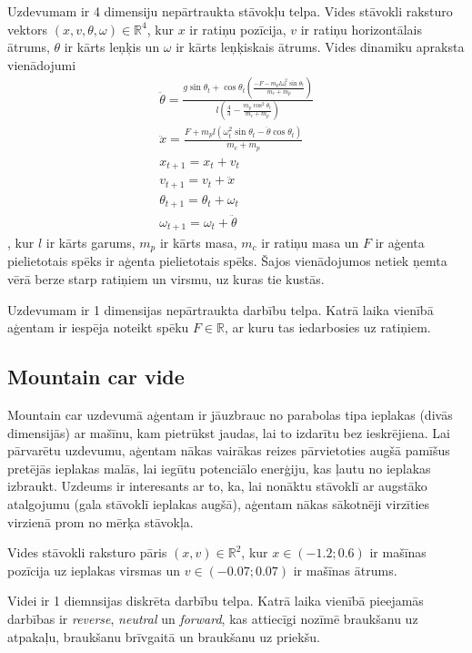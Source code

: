 \documentclass{ludis} %
\begin{document}
Uzdevumam ir 4 dimensiju nepārtraukta stāvokļu telpa. Vides stāvokli raksturo
vektors $(x, v, \theta, \omega) \in \mathbb{R}^4$, kur $x$ ir ratiņu pozīcija,
$v$ ir ratiņu horizontālais ātrums, $\theta$ ir kārts leņķis un $\omega$ ir
kārts leņķiskais ātrums. Vides dinamiku apraksta vienādojumi
\begin{gather}
  \ddot{\theta} = \frac{g \sin\theta_t + \cos\theta_t \left(\frac{-F - m_p l \omega_t^2\sin\theta_t}
                                                         {m_c + m_p}\right)}
                        {l \left(\frac{4}{3} - \frac{m_p\cos^2\theta_t}
                                               {m_c + m_p}\right)} \\ 
  \ddot{x} = \frac{F + m_p l \left(\omega_t^2\sin\theta_t - \ddot{\theta}\cos\theta_t\right)}
                   {m_c + m_p} \\
  x_{t+1} = x_t + v_t \\
  v_{t+1} = v_t + \ddot{x} \\
  \theta_{t+1} = \theta_t + \omega_t \\
  \omega_{t+1} = \omega_t + \ddot{\theta}
\end{gather},
kur $l$ ir kārts garums, $m_p$ ir kārts masa, $m_c$ ir ratiņu masa un $F$ ir
aģenta pielietotais spēks ir aģenta pielietotais spēks. Šajos vienādojumos
netiek ņemta vērā berze starp ratiņiem un virsmu, uz kuras tie kustās.

Uzdevumam ir 1 dimensijas nepārtraukta darbību telpa. Katrā laika vienībā
aģentam ir iespēja noteikt spēku $F \in \mathbb{R}$, ar kuru tas iedarbosies uz
ratiņiem.

\subsection{Mountain car vide}
Mountain car uzdevumā aģentam ir jāuzbrauc no parabolas tipa ieplakas (divās
dimensijās) ar mašīnu, kam pietrūkst jaudas, lai to izdarītu bez ieskrējiena.
Lai pārvarētu uzdevumu, aģentam nākas vairākas reizes pārvietoties augšā
pamīšus pretējās ieplakas malās, lai iegūtu potenciālo enerģiju, kas ļautu no
ieplakas izbraukt. Uzdeums ir interesants ar to, ka, lai nonāktu stāvoklī ar
augstāko atalgojumu (gala stāvoklī ieplakas augšā), aģentam nākas sākotnēji
virzīties virzienā prom no mērķa stāvokļa.

Vides stāvokli raksturo pāris $(x, v) \in \mathbb{R}^2$, kur $x \in (-1.2; 0.6)$
ir mašīnas pozīcija uz ieplakas virsmas un $v \in (-0.07; 0.07)$ ir mašīnas
ātrums.

Videi ir 1 diemnsijas diskrēta darbību telpa. Katrā laika vienībā pieejamās
darbības ir \textit{reverse}, \textit{neutral} un \textit{forward}, kas
attiecīgi nozīmē braukšanu uz atpakaļu, braukšanu brīvgaitā un braukšanu uz
priekšu.
\end{document}
